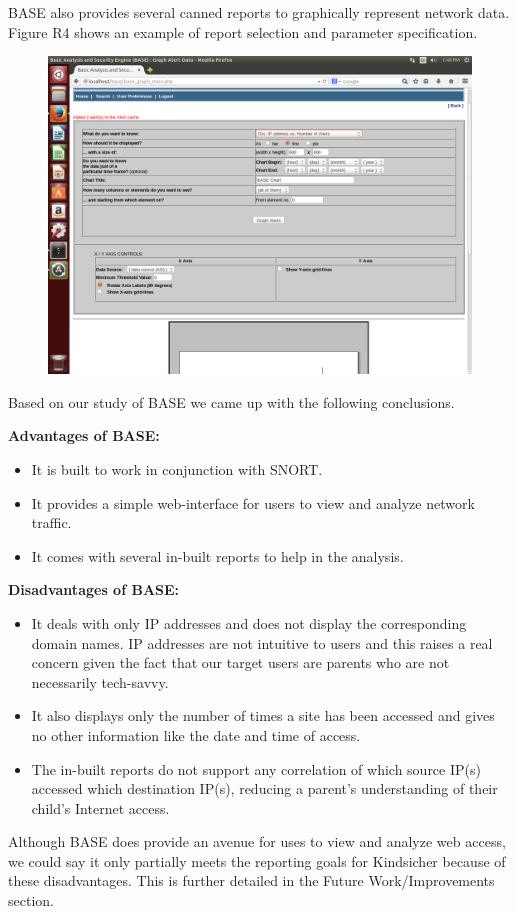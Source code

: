 BASE also provides several canned reports to graphically represent
network data. Figure R4 shows an example of report selection and
parameter specification.

\begin{figure}
\includegraphics{figures/R4_BASE_Report}
\end{figure}

Based on our study of BASE we came up with the following conclusions.

\textbf{Advantages of BASE:}
\begin{itemize}

\item It is built to work in conjunction with SNORT.

\item It provides a simple web-interface for users to view and
  analyze network traffic.

\item It comes with several in-built reports to help in the analysis.

\end{itemize}

\textbf{Disadvantages of BASE:}
\begin{itemize}

\item It deals with only IP addresses and does not display the
  corresponding domain names. 
  IP addresses are not intuitive to users and this raises a real
  concern given the fact that our target users are parents who are not
  necessarily tech-savvy.

\item It also displays only the number of times a site has been
  accessed and gives no other information like the date and time of
  access.

\item The in-built reports do not support any correlation of which
  source IP(s) accessed which destination IP(s), reducing a parent's
  understanding of their child's Internet access.

\end{itemize}

Although BASE does provide an avenue for uses to view and analyze web
access, we could say it only partially meets the reporting goals for
Kindsicher because of these disadvantages. 
%
This is further detailed in the Future Work/Improvements section.
